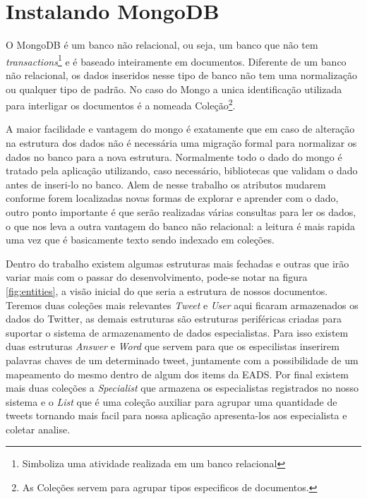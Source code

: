 \chapter{Instalando MongoDB}
O MongoDB é um banco não relacional, ou seja, um banco que não tem \textit{transactions}\footnote{Simboliza uma atividade realizada em um banco relacional} e é baseado inteiramente em documentos. Diferente de um banco não relacional, os dados inseridos nesse tipo de banco não tem uma normalização ou qualquer tipo de padrão. No caso do Mongo a unica identificação utilizada para interligar os documentos é a nomeada Coleção\footnote{As Coleções servem para agrupar tipos especificos de documentos.}.

A maior facilidade e vantagem do mongo é exatamente que em caso de alteração na estrutura dos dados não é necessária uma migração formal para normalizar os dados no banco para a nova estrutura. Normalmente todo o dado do mongo é tratado pela aplicação utilizando, caso necessário, bibliotecas que validam o dado antes de inseri-lo no banco. Alem de nesse trabalho os atributos mudarem conforme forem localizadas novas formas de explorar e aprender com o dado, outro ponto importante é que serão realizadas várias consultas para ler os dados, o que nos leva a outra vantagem do banco não relacional: a leitura é mais rapida uma vez que é basicamente texto sendo indexado em coleções.

Dentro do trabalho existem algumas estruturas mais fechadas e outras que irão variar mais com o passar do desenvolvimento, pode-se notar na figura \ref{fig:entities}, a visão inicial do que seria a estrutura de nossos documentos. Teremos duas coleções mais relevantes \textit{Tweet} e \textit{User} aqui ficaram armazenados os dados do Twitter, as demais estruturas são estruturas periféricas criadas para suportar o sistema de armazenamento de dados especialistas. Para isso existem duas estruturas \textit{Answer} e \textit{Word} que servem para que os especilistas inserirem palavras chaves de um determinado tweet, juntamente com a possibilidade de um mapeamento do mesmo dentro de algum dos items da EADS. Por final existem mais duas coleções a \textit{Specialist} que armazena os especialistas registrados no nosso sistema e o \textit{List} que é uma coleção auxiliar para agrupar uma quantidade de tweets tornando mais facil para nossa aplicação apresenta-los aos especialista e coletar analise.

